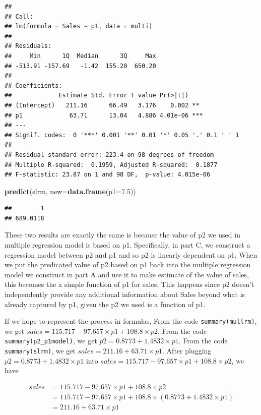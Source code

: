 \documentclass[
]{article}
\newenvironment{Shaded}{\begin{snugshade}}{\end{snugshade}}
\newcommand{\AttributeTok}[1]{\textcolor[rgb]{0.13,0.29,0.53}{#1}}
\newcommand{\FloatTok}[1]{\textcolor[rgb]{0.00,0.00,0.81}{#1}}
\newcommand{\FunctionTok}[1]{\textcolor[rgb]{0.13,0.29,0.53}{\textbf{#1}}}
\newcommand{\NormalTok}[1]{#1}
\begin{document}
\begin{verbatim}
## 
## Call:
## lm(formula = Sales ~ p1, data = multi)
## 
## Residuals:
##     Min      1Q  Median      3Q     Max 
## -513.91 -157.69   -1.42  155.20  650.20 
## 
## Coefficients:
##             Estimate Std. Error t value Pr(>|t|)    
## (Intercept)   211.16      66.49   3.176    0.002 ** 
## p1             63.71      13.04   4.886 4.01e-06 ***
## ---
## Signif. codes:  0 '***' 0.001 '**' 0.01 '*' 0.05 '.' 0.1 ' ' 1
## 
## Residual standard error: 223.4 on 98 degrees of freedom
## Multiple R-squared:  0.1959, Adjusted R-squared:  0.1877 
## F-statistic: 23.87 on 1 and 98 DF,  p-value: 4.015e-06
\end{verbatim}

\begin{Shaded}
\begin{Highlighting}[]
\FunctionTok{predict}\NormalTok{(slrm, }\AttributeTok{new=}\FunctionTok{data.frame}\NormalTok{(}\AttributeTok{p1=}\FloatTok{7.5}\NormalTok{))}
\end{Highlighting}
\end{Shaded}

\begin{verbatim}
##        1 
## 689.0118
\end{verbatim}

These two results are exactly the same is because the value of p2 we
used in multiple regression model is based on p1. Specifically, in part
C, we construct a regression model between p2 and p1 and so p2 is
linearly dependent on p1. When we put the predicated value of p2 based
on p1 back into the multiple regression model we construct in part A and
use it to make estimate of the value of sales, this becomes the a simple
function of p1 for sales. This happens since p2 doesn't independently
provide any additional information about Sales beyond what is already
captured by p1, given the p2 we used is a function of p1.

If we hope to represent the process in formulas, From the code
\texttt{summary(mullrm)}, we get
\(sales = 115.717-97.657\times p1 + 108.8 \times p2\). From the code
\texttt{summary(p2\_p1model)}, we get
\(p2 = 0.8773 + 1.4832 \times p1\). From the code
\texttt{summary(slrm)}, we get \(sales = 211.16 + 63.71 \times p1\).
After plugging \(p2 = 0.8773 + 1.4832 \times p1\) into
\(sales = 115.717-97.657\times p1 + 108.8 \times p2\), we have

\[
\begin{aligned}
 sales &= 115.717-97.657\times p1 + 108.8 \times p2 \\
       &= 115.717-97.657\times p1 + 108.8 \times (0.8773 + 1.4832 \times p1) \\ 
       &= 211.16 + 63.71\times p1
\end{aligned}
\] \newpage
\end{document}
